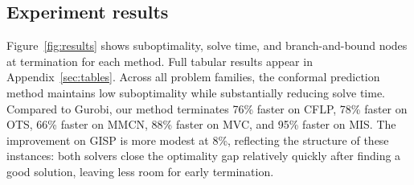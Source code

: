 \documentclass[12pt]{article}
\renewcommand{\cite}[1]{\citep{#1}}
\theoremstyle{definition}
\theoremstyle{remark}
\theoremstyle{plain}
\theoremstyle{definition}
\theoremstyle{remark}
\begin{document}



\subsection{Experiment results}
Figure~\ref{fig:results} shows suboptimality, solve time, and branch-and-bound nodes at termination for each method.
Full tabular results appear in Appendix~\ref{sec:tables}.
Across all problem families, the conformal prediction method maintains low suboptimality while substantially reducing solve time.
Compared to Gurobi, our method terminates 76\% faster on CFLP, 78\% faster on OTS, 66\% faster on MMCN, 88\% faster on MVC, and 95\% faster on MIS.
The improvement on GISP is more modest at 8\%, reflecting the structure of these instances: both solvers close the optimality gap relatively quickly after finding a good solution, leaving less room for early termination.
\end{document}
